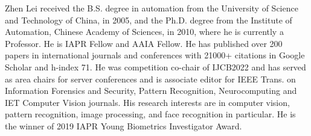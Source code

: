 \documentclass[10pt,journal,compsoc]{IEEEtran}
\begin{document}
	

	




	
\begin{IEEEbiography}{Zhen Lei}
received the B.S. degree in automation from the University of Science and Technology of China, in 2005, and the Ph.D. degree from the Institute of Automation, Chinese Academy of Sciences, in 2010, where he is currently a Professor. He is IAPR Fellow and AAIA Fellow. He has published over 200 papers in international journals and conferences with 21000+ citations in Google Scholar and h-index 71. He was competition co-chair of IJCB2022 and has served as area chairs for server conferences and is associate editor for IEEE Trans. on Information Forensics and Security, Pattern Recognition, Neurocomputing and IET Computer Vision journals. His research interests are in computer vision, pattern recognition, image processing, and face recognition in particular. He is the winner of 2019 IAPR Young Biometrics Investigator Award.  

\end{IEEEbiography}
	
\end{document}
